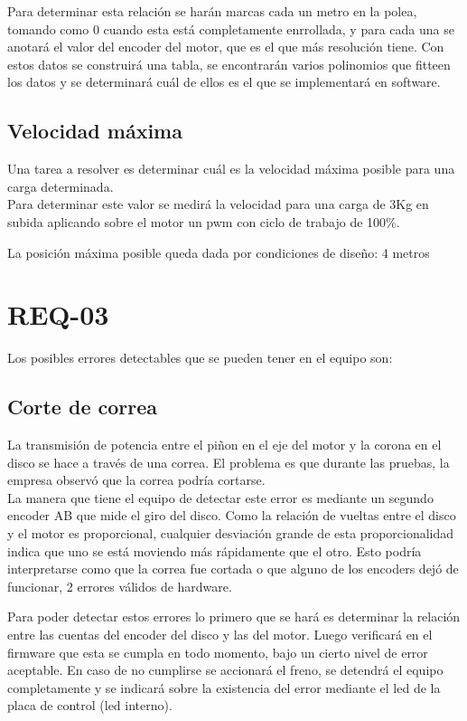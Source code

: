 Para determinar esta relación se harán marcas cada un metro en la polea, tomando como 0 cuando esta está completamente enrrollada, y para cada una se anotará el valor del encoder del motor, que es el que más resolución tiene. Con estos datos se construirá una tabla, se encontrarán varios polinomios que fitteen los datos y se determinará cuál de ellos es el que se implementará en software.

\subsection{Velocidad máxima}
Una tarea a resolver es determinar cuál es la velocidad máxima posible para una carga determinada.\\

Para determinar este valor se medirá la velocidad para una carga de 3Kg en subida aplicando sobre el motor un pwm con ciclo de trabajo de 100\%.

La posición máxima posible queda dada por condiciones de diseño: 4 metros

\section{REQ-03} \label{sec:\thesection}
Los posibles errores detectables que se pueden tener en el equipo son:

\subsection{Corte de correa}
La transmisión de potencia entre el piñon en el eje del motor y la corona en el disco se hace a través de una correa. El problema es que durante las pruebas, la empresa observó que la correa podría cortarse. \\
La manera que tiene el equipo de detectar este error es mediante un segundo encoder AB que mide el giro del disco. Como la relación de vueltas entre el disco y el motor es proporcional, cualquier desviación grande de esta proporcionalidad indica que uno se está moviendo más rápidamente que el otro. Esto podría interpretarse como que la correa fue cortada o que alguno de los encoders dejó de funcionar, 2 errores válidos de hardware.

Para poder detectar estos errores lo primero que se hará es determinar la relación entre las cuentas del encoder del disco y las del motor. Luego verificará en el firmware que esta se cumpla en todo momento, bajo un cierto nivel de error aceptable. En caso de no cumplirse se accionará el freno, se detendrá el equipo completamente y se indicará sobre la existencia del error mediante el led de la placa de control (led interno).

